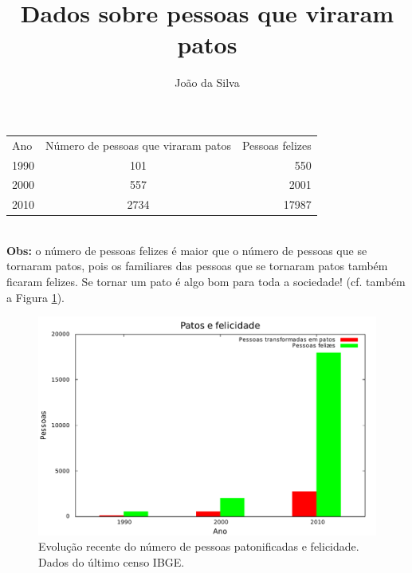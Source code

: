 \documentclass[11pt, a4paper]{article}
\title{Dados sobre pessoas que viraram patos}
\author{João da Silva}
\begin{document}
  \maketitle

  \begin{tabular}{l c r}
    Ano & Número de pessoas que viraram patos & Pessoas felizes\\
    1990 & 101 & 550\\
    2000 & 557 & 2001\\
    2010 & 2734 & 17987\\
  \end{tabular}
  \\[1cm]
  \textbf{Obs:} o número de pessoas felizes é maior que o número de pessoas que se tornaram patos, pois os familiares das pessoas que se tornaram patos também ficaram felizes. Se tornar um pato é algo bom para toda a sociedade! (cf. também a Figura \ref{fig:graf_pato}).

  \begin{figure}[htb]
    \centering
    \includegraphics[width=\textwidth]{grafico_patos.pdf}
    \caption{Evolução recente do número de pessoas patonificadas e felicidade. Dados do último censo IBGE.}
    \label{fig:graf_pato}
  \end{figure}
\end{document}
